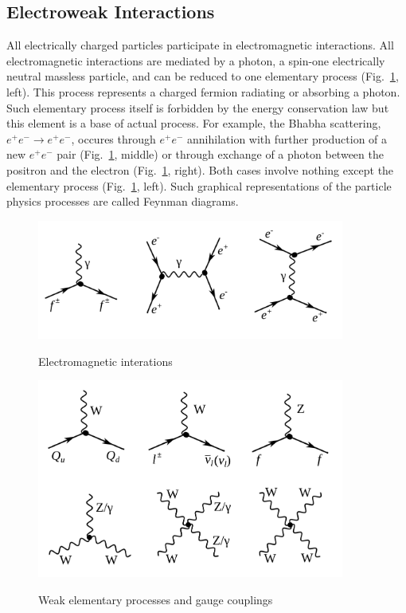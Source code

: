 \subsection{Electroweak Interactions}
\label{sec:Intro_Electroweak}

All electrically charged particles participate in electromagnetic interactions. All electromagnetic interactions are mediated by a photon, a spin-one electrically neutral massless particle, and can be reduced to one elementary process (Fig.~\ref{fig:feynmEM}, left). This process represents a charged fermion radiating or absorbing a photon. Such elementary process itself is forbidden by the energy conservation law but this element is a base of actual process. For example, the Bhabha scattering, $e^+e^- \rightarrow e^+e^-$, occures through $e^+e^-$ annihilation with further production of a new $e^+e^-$ pair (Fig.~\ref{fig:feynmEM}, middle) or through exchange of a photon between the positron and the electron (Fig.~\ref{fig:feynmEM}, right). Both cases involve nothing except the elementary process (Fig.~\ref{fig:feynmEM}, left). Such graphical representations of the particle physics processes are called Feynman diagrams.\\ 

\begin{figure}[htb]
  \begin{center}
    {\includegraphics[width=0.90\textwidth]{../figs/Intro/feynmEM.png}}
    \caption{Electromagnetic interations}
    \label{fig:feynmEM}
  \end{center}
\end{figure}

\begin{figure}[htb]
  \begin{center}
    {\includegraphics[width=0.90\textwidth]{../figs/Intro/feynmW.png}}
    \caption{Weak elementary processes and gauge couplings}
    \label{fig:feynmW}
  \end{center}
\end{figure}


